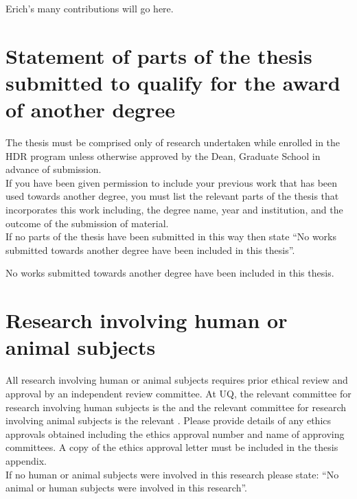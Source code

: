 \noindent
Erich's many contributions will go here.



\section*{Statement of parts of the thesis submitted to qualify for the award of another degree}

\begin{instructional}
    The thesis must be comprised only of research undertaken while enrolled in the HDR program unless otherwise approved by the Dean, Graduate School in advance of submission.\\
    
    \noindent
    If you have been given permission to include your previous work that has been used towards another degree, you must list the relevant parts of the thesis that incorporates this work including, the degree name, year and institution, and the outcome of the submission of material. \\
    
    \noindent
    If no parts of the thesis have been submitted in this way then state ``No works submitted towards another degree have been included in this thesis''.
\end{instructional}


No works submitted towards another degree have been included in this thesis.



\section*{Research involving human or animal subjects}

\begin{instructional}
	All research involving human or animal subjects requires prior ethical review and approval by an independent review committee. At UQ, the relevant committee for research involving human subjects is the \href{http://www.uq.edu.au/research/integrity-compliance/human-ethics}{\color{blue}{Human Ethics Unit}} and the relevant committee for research involving animal subjects is the relevant \href{http://www.uq.edu.au/research/integrity-compliance/animal-welfare}{\color{blue}{Animal Ethics Committee}}.  Please provide details of any ethics approvals obtained including the ethics approval number and name of approving committees.  A copy of the ethics approval letter must be included in the thesis appendix.\\
    
    \noindent
	If no human or animal subjects were involved in this research please state: ``No animal or human subjects were involved in this research''.
\end{instructional}

